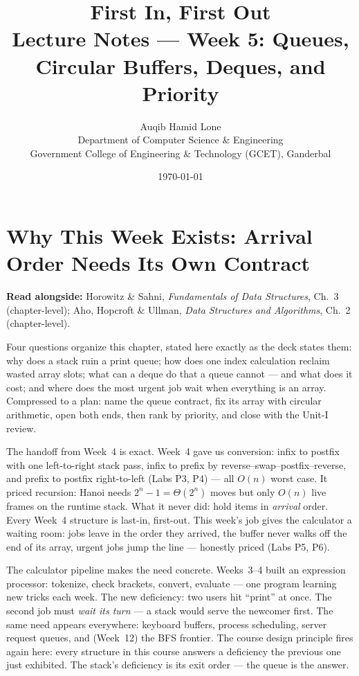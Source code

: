 \documentclass[11pt]{article}
\title{First In, First Out\\\large Lecture Notes --- Week 5: Queues, Circular Buffers, Deques, and Priority}
\author{Auqib Hamid Lone\\[0.3em]
  \small Department of Computer Science \& Engineering\\
  \small Government College of Engineering \& Technology (GCET), Ganderbal}
\date{\today}
\begin{document}
\maketitle

\section{Why This Week Exists: Arrival Order Needs Its Own Contract}

\textbf{Read alongside:} Horowitz \& Sahni, \textit{Fundamentals of Data Structures}, Ch.~3 (chapter-level); Aho, Hopcroft \& Ullman, \textit{Data Structures and Algorithms}, Ch.~2 (chapter-level).

Four questions organize this chapter, stated here exactly as the deck states them: why does a stack ruin a print queue; how does one index calculation reclaim wasted array slots; what can a deque do that a queue cannot --- and what does it cost; and where does the most urgent job wait when everything is an array. Compressed to a plan: name the queue contract, fix its array with circular arithmetic, open both ends, then rank by priority, and close with the Unit-I review.

The handoff from Week~4 is exact. Week~4 gave us conversion: infix to postfix with one left-to-right stack pass, infix to prefix by reverse--swap--postfix--reverse, and prefix to postfix right-to-left (Labs P3, P4) --- all $O(n)$ worst case. It priced recursion: Hanoi needs $2^{n} - 1 = \Theta(2^{n})$ moves but only $O(n)$ live frames on the runtime stack. What it never did: hold items in \emph{arrival} order. Every Week~4 structure is last-in, first-out. This week's job gives the calculator a waiting room: jobs leave in the order they arrived, the buffer never walks off the end of its array, urgent jobs jump the line --- honestly priced (Labs P5, P6).

The calculator pipeline makes the need concrete. Weeks~3--4 built an expression processor: tokenize, check brackets, convert, evaluate --- one program learning new tricks each week. The new deficiency: two users hit ``print'' at once. The second job must \emph{wait its turn} --- a stack would serve the newcomer first. The same need appears everywhere: keyboard buffers, process scheduling, server request queues, and (Week~12) the BFS frontier. The course design principle fires again here: every structure in this course answers a deficiency the previous one just exhibited. The stack's deficiency is its exit order --- the queue is the answer. 
\end{document}
